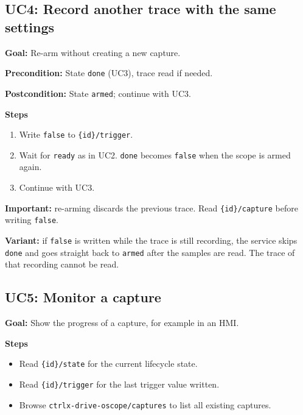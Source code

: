 \documentclass[11pt,a4paper]{article}
\newcommand{\dl}[1]{\texttt{#1}}
\newcommand{\capsroot}{\dl{ctrlx-drive-oscope/captures}}
\newenvironment{usecase}[1]
  {\subsection{#1}}
  {}
\newcommand{\ucfield}[2]{\par\noindent\textbf{#1:} #2\par}
\begin{document}
\begin{usecase}{UC4: Record another trace with the same settings}
\ucfield{Goal}{Re-arm without creating a new capture.}
\ucfield{Precondition}{State \dl{done} (UC3), trace read if needed.}
\ucfield{Postcondition}{State \dl{armed}; continue with UC3.}

\textbf{Steps}
\begin{enumerate}[nosep]
  \item Write \dl{false} to \dl{\{id\}/trigger}.
  \item Wait for \dl{ready} as in UC2. \dl{done} becomes \dl{false} when the
        scope is armed again.
  \item Continue with UC3.
\end{enumerate}

\textbf{Important:} re-arming discards the previous trace. Read
\dl{\{id\}/capture} before writing \dl{false}.

\textbf{Variant:} if \dl{false} is written while the trace is still recording,
the service skips \dl{done} and goes straight back to \dl{armed} after the
samples are read. The trace of that recording cannot be read.
\end{usecase}

\begin{usecase}{UC5: Monitor a capture}
\ucfield{Goal}{Show the progress of a capture, for example in an HMI.}

\textbf{Steps}
\begin{itemize}[nosep]
  \item Read \dl{\{id\}/state} for the current lifecycle state.
  \item Read \dl{\{id\}/trigger} for the last trigger value written.
  \item Browse \capsroot{} to list all existing captures.
\end{itemize}
\end{usecase}
\end{document}
